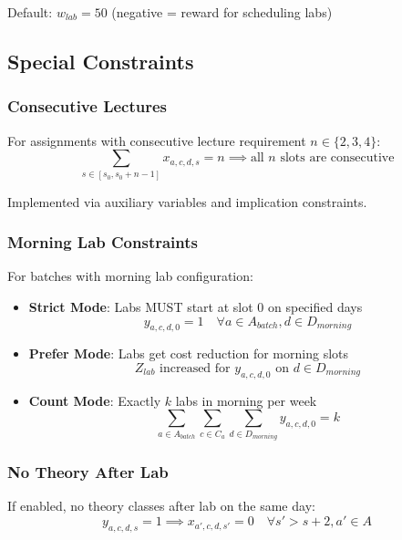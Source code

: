 \documentclass[12pt,a4paper]{article}
\begin{document}
Default: $w_{lab} = 50$ (negative = reward for scheduling labs)

\subsection{Special Constraints}

\subsubsection{Consecutive Lectures}
For assignments with consecutive lecture requirement $n \in \{2, 3, 4\}$:
\begin{equation}
\sum_{s \in [s_0, s_0 + n - 1]} x_{a,c,d,s} = n \implies \text{all } n \text{ slots are consecutive}
\end{equation}

Implemented via auxiliary variables and implication constraints.

\subsubsection{Morning Lab Constraints}
For batches with morning lab configuration:
\begin{itemize}
    \item \textbf{Strict Mode}: Labs MUST start at slot 0 on specified days
    \begin{equation}
    y_{a,c,d,0} = 1 \quad \forall a \in A_{batch}, d \in D_{morning}
    \end{equation}
    
    \item \textbf{Prefer Mode}: Labs get cost reduction for morning slots
    \begin{equation}
    Z_{lab} \text{ increased for } y_{a,c,d,0} \text{ on } d \in D_{morning}
    \end{equation}
    
    \item \textbf{Count Mode}: Exactly $k$ labs in morning per week
    \begin{equation}
    \sum_{a \in A_{batch}} \sum_{c \in C_a} \sum_{d \in D_{morning}} y_{a,c,d,0} = k
    \end{equation}
\end{itemize}


\subsubsection{No Theory After Lab}
If enabled, no theory classes after lab on the same day:
\begin{equation}
y_{a,c,d,s} = 1 \implies x_{a',c,d,s'} = 0 \quad \forall s' > s + 2, a' \in A
\end{equation}
\end{document}
